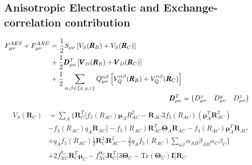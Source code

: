 \subsection{Anisotropic Electrostatic and Exchange-correlation contribution}
\begin{align}
    \begin{split}
    F^{AES}_{\mu\nu}+F^{AXC}_{\mu\nu} &= \frac{1}{2}S_{\mu\nu}\left[V_S(\pmb{R}_B)+ V_S(\pmb{R}_C)\right]\\
    &+ \frac{1}{2}\pmb{D}^T_{\mu\nu}\left[\pmb{V}_D(\pmb{R}_B)+\pmb{V}_D(\pmb{R}_C)\right]\\
    &+ \frac{1}{2} \sum_{\alpha,\beta\in\{x,y,z\}} Q^{\alpha\beta}_{\mu\nu}\left[V_Q^{\alpha\beta}(\pmb{R}_B)+ V_Q^{\alpha\beta}(\pmb{R}_C)\right]
    \end{split}\\
    \pmb{D}^T_{\mu\nu} &=
    \begin{pmatrix}
        D^x_{\mu\nu} &
        D^y_{\mu\nu} &
        D^z_{\mu\nu}\\
    \end{pmatrix}\\
\end{align}
\begin{align}
    \begin{split}
        V_S(\pmb{R}_C)& = \sum_A \Biggl\{
        \pmb{R}_C^T\biggl[
            f_5(R_{AC})\pmb{\mu}_AR^2_{AC} - 
            \pmb{R}_{AC}3f_5(R_{AC})(\pmb{\mu}_A^T\pmb{R}^2_{AC}) \\&- 
            f_3(R_{AC})q_A\pmb{R}_{AC}
        \biggr] 
    - f_5(R_{AC})\pmb{R}^T_{AC}\pmb{\Theta}_A\pmb{R}_{AC}
          - f_3(R_{AC})\pmb{\mu}^T_{A}\pmb{R}_{AC}\\
          &+q_Af_5(R_{AC})\frac{1}{2}\pmb{R}_C^2\pmb{R}_{AC}^2 
          - \frac{3}{2}q_Af_5(R_{AC})\sum_{\alpha\beta}\alpha_{AB}\beta_{AB}\alpha_{C}\beta_{C}\Biggr\}\\
      &+2f_{XC}^{\mu_C}\pmb R^T_C\pmb\mu_C - f_{XC}^{\Theta_C}\pmb R^T_C\biggl[3\pmb\Theta_C-\text{Tr}(\pmb\Theta_C)\pmb I\biggr]\pmb R_C
    \end{split}
\end{align}


